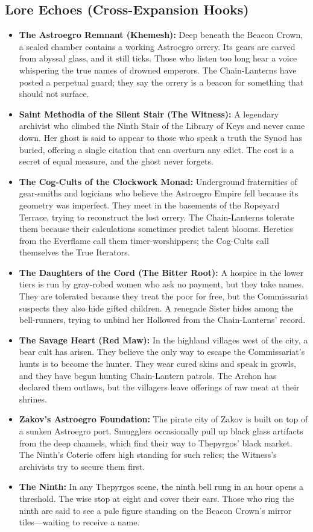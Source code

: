 \subsection*{Lore Echoes (Cross-Expansion Hooks)}
\begin{itemize}
  \item \textbf{The Astroegro Remnant (Khemesh):} Deep beneath the Beacon Crown, a sealed chamber contains a working Astroegro orrery. Its gears are carved from abyssal glass, and it still ticks. Those who listen too long hear a voice whispering the true names of drowned emperors. The Chain-Lanterns have posted a perpetual guard; they say the orrery is a beacon for something that should not surface.
  \item \textbf{Saint Methodia of the Silent Stair (The Witness):} A legendary archivist who climbed the Ninth Stair of the Library of Keys and never came down. Her ghost is said to appear to those who speak a truth the Synod has buried, offering a single citation that can overturn any edict. The cost is a secret of equal measure, and the ghost never forgets.
  \item \textbf{The Cog-Cults of the Clockwork Monad:} Underground fraternities of gear-smiths and logicians who believe the Astroegro Empire fell because its geometry was imperfect. They meet in the basements of the Ropeyard Terrace, trying to reconstruct the lost orrery. The Chain-Lanterns tolerate them because their calculations sometimes predict talent blooms. Heretics from the Everflame call them timer-worshippers; the Cog-Cults call themselves the True Iterators.
  \item \textbf{The Daughters of the Cord (The Bitter Root):} A hospice in the lower tiers is run by gray-robed women who ask no payment, but they take names. They are tolerated because they treat the poor for free, but the Commissariat suspects they also hide gifted children. A renegade Sister hides among the bell-runners, trying to unbind her Hollowed from the Chain-Lanterns' record.
  \item \textbf{The Savage Heart (Red Maw):} In the highland villages west of the city, a bear cult has arisen. They believe the only way to escape the Commissariat's hunts is to become the hunter. They wear cured skins and speak in growls, and they have begun hunting Chain-Lantern patrols. The Archon has declared them outlaws, but the villagers leave offerings of raw meat at their shrines.
  \item \textbf{Zakov's Astroegro Foundation:} The pirate city of Zakov is built on top of a sunken Astroegro port. Smugglers occasionally pull up black glass artifacts from the deep channels, which find their way to Thepyrgos' black market. The Ninth's Coterie offers high standing for such relics; the Witness's archivists try to secure them first.
  \item \textbf{The Ninth:} In any Thepyrgos scene, the ninth bell rung in an hour opens a threshold. The wise stop at eight and cover their ears. Those who ring the ninth are said to see a pale figure standing on the Beacon Crown's mirror tiles---waiting to receive a name.
\end{itemize}

